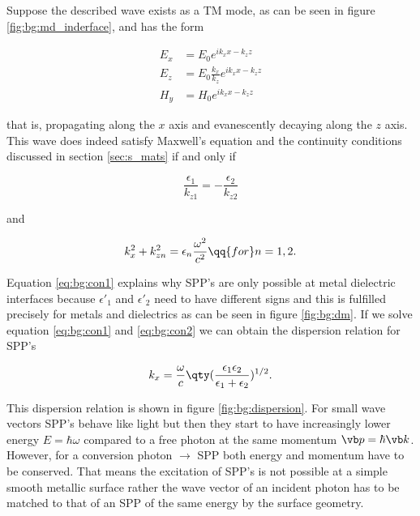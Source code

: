 Suppose the described wave exists as a TM mode, as can be seen in figure \ref{fig:bg:md_inderface}, and has the form 

\begin{equation}
\begin{aligned}
    E_x &= E_0 e^{i k_x x - k_z z} \\
    E_z &= E_0 \frac{k_x}{k_z} e^{i k_x x - k_z z}\\
    H_y &= H_0 e^{i k_x x - k_z z}
\end{aligned}
\end{equation}

that is, propagating along the $x$ axis and evanescently decaying along the $z$ axis. This wave does indeed satisfy Maxwell's equation and the continuity conditions discussed in section \ref{sec:s_mats} if and only if \cite{Maier2007}

\begin{equation} \label{eq:bg:con1}
    \frac{\epsilon_1}{k_{z1}} = - \frac{\epsilon_2}{k_{z2}} 
\end{equation}

and

\begin{equation} \label{eq:bg:con2}
    k_x^2 + k_{zn}^2 = \epsilon_n \frac{\omega^2}{c^2}
    \qq{for}
    n = 1,2.
\end{equation}

Equation \eqref{eq:bg:con1} explains why SPP's are only possible at metal dielectric interfaces because $\epsilon'_1$ and $\epsilon'_2$ need to have different signs and this is fulfilled precisely for metals and dielectrics as can be seen in figure \ref{fig:bg:dm}. If we solve equation \eqref{eq:bg:con1} and \eqref{eq:bg:con2} we can obtain the dispersion relation for SPP's

\begin{equation}
    k_x = \frac{\omega}{c}
    \qty(\frac{\epsilon_1 \epsilon_2}{\epsilon_1 + \epsilon_2})^{1/2}.
\end{equation}

This dispersion relation is shown in figure \ref{fig:bg:dispersion}. For small wave vectors SPP's behave like light but then they start to have increasingly lower energy $E = \hbar \omega$ compared to a free photon at the same momentum $\vb p = \hbar \vb k$. However, for a conversion photon $\rightarrow$ SPP both energy and momentum have to be conserved. That means the excitation of SPP's is not possible at a simple smooth metallic surface rather the wave vector of an incident photon has to be matched to that of an SPP of the same energy by the surface geometry. 

